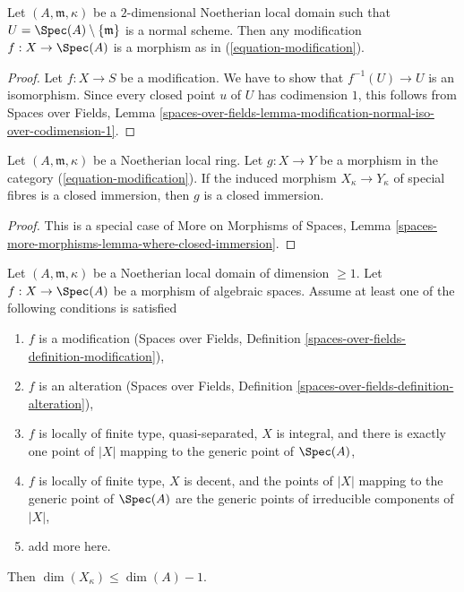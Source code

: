 \begin{lemma}
\label{lemma-modification}
Let $(A, \mathfrak m, \kappa)$ be a $2$-dimensional Noetherian
local domain such that $U = \Spec(A) \setminus \{\mathfrak m\}$
is a normal scheme. Then any modification $f : X \to \Spec(A)$
is a morphism as in (\ref{equation-modification}).
\end{lemma}

\begin{proof}
Let $f : X \to S$ be a modification. We have to show that
$f^{-1}(U) \to U$ is an isomorphism. Since every closed point $u$ of $U$
has codimension $1$, this follows from
Spaces over Fields, Lemma
\ref{spaces-over-fields-lemma-modification-normal-iso-over-codimension-1}.
\end{proof}

\begin{lemma}
\label{lemma-closed-immersion-on-fibre}
Let $(A, \mathfrak m, \kappa)$ be a Noetherian local ring.
Let $g : X \to Y$ be a morphism in the category (\ref{equation-modification}).
If the induced morphism $X_\kappa \to Y_\kappa$ of special fibres is
a closed immersion, then $g$ is a closed immersion.
\end{lemma}

\begin{proof}
This is a special case of
More on Morphisms of Spaces, Lemma
\ref{spaces-more-morphisms-lemma-where-closed-immersion}.
\end{proof}

\begin{lemma}
\label{lemma-dimension-special-fibre}
Let $(A, \mathfrak m, \kappa)$ be a Noetherian local domain
of dimension $\geq 1$.
Let $f : X \to \Spec(A)$ be a morphism of algebraic spaces.
Assume at least one of the following conditions is satisfied
\begin{enumerate}
\item $f$ is a modification (Spaces over Fields, Definition
\ref{spaces-over-fields-definition-modification}),
\item $f$ is an alteration (Spaces over Fields, Definition
\ref{spaces-over-fields-definition-alteration}),
\item $f$ is locally of finite type, quasi-separated, $X$ is integral,
and there is exactly one point of $|X|$ mapping to the generic point
of $\Spec(A)$,
\item $f$ is locally of finite type, $X$ is decent, and the points
of $|X|$ mapping to the generic point of $\Spec(A)$ are
the generic points of irreducible components of $|X|$,
\item add more here.
\end{enumerate}
Then $\dim(X_\kappa) \leq \dim(A) - 1$.
\end{lemma}

